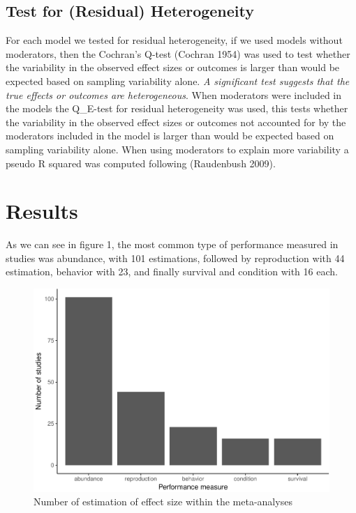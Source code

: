 \documentclass[]{elsarticle} %
\makeatletter
\def\maxwidth{\ifdim\Gin@nat@width>\linewidth\linewidth
\else\Gin@nat@width\fi}
\let\Oldincludegraphics\includegraphics
\renewcommand{\includegraphics}[1]{\Oldincludegraphics[width=\maxwidth]{#1}}
\makeatother
\begin{document}
\subsection{Test for (Residual)
Heterogeneity}\label{test-for-residual-heterogeneity}

For each model we tested for residual heterogeneity, if we used models
without moderators, then the Cochran's Q-test (Cochran 1954) was used to
test whether the variability in the observed effect sizes or outcomes is
larger than would be expected based on sampling variability alone.
\emph{A significant test suggests that the true effects or outcomes are
heterogeneous}. When moderators were included in the models the
Q\_E-test for residual heterogeneity was used, this tests whether the
variability in the observed effect sizes or outcomes not accounted for
by the moderators included in the model is larger than would be expected
based on sampling variability alone. When using moderators to explain
more variability a pseudo R squared was computed following (Raudenbush
2009).

\section{Results}\label{results}

As we can see in figure 1, the most common type of performance measured
in studies was abundance, with 101 estimations, followed by reproduction
with 44 estimation, behavior with 23, and finally survival and condition
with 16 each.

\begin{figure}[htbp]
\centering
\includegraphics{MetanalysisNeonics_files/figure-latex/unnamed-chunk-2-1.pdf}
\caption{Number of estimation of effect size within the meta-analyses}
\end{figure}
\end{document}
